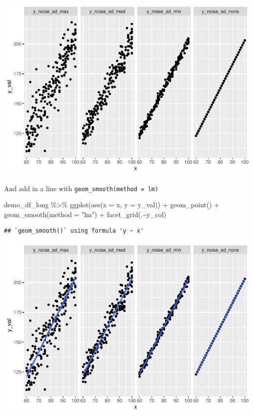 \documentclass[
]{book}
\newenvironment{Shaded}{\begin{snugshade}}{\end{snugshade}}
\newcommand{\AttributeTok}[1]{\textcolor[rgb]{0.77,0.63,0.00}{#1}}
\newcommand{\FunctionTok}[1]{\textcolor[rgb]{0.00,0.00,0.00}{#1}}
\newcommand{\NormalTok}[1]{#1}
\newcommand{\SpecialCharTok}[1]{\textcolor[rgb]{0.00,0.00,0.00}{#1}}
\newcommand{\StringTok}[1]{\textcolor[rgb]{0.31,0.60,0.02}{#1}}
\begin{document}
\includegraphics{test_course_notes_files/figure-latex/remedy035-1.pdf}

And add in a line with \texttt{geom\_smooth(method\ =\ \textquotesingle{}lm\textquotesingle{})}

\begin{Shaded}
\begin{Highlighting}[]
\NormalTok{demo\_df\_long }\SpecialCharTok{\%\textgreater{}\%} 
  \FunctionTok{ggplot}\NormalTok{(}\FunctionTok{aes}\NormalTok{(}\AttributeTok{x =}\NormalTok{ x, }\AttributeTok{y =}\NormalTok{ y\_val)) }\SpecialCharTok{+}
  \FunctionTok{geom\_point}\NormalTok{() }\SpecialCharTok{+}
  \FunctionTok{geom\_smooth}\NormalTok{(}\AttributeTok{method =} \StringTok{"lm"}\NormalTok{) }\SpecialCharTok{+} 
  \FunctionTok{facet\_grid}\NormalTok{(.}\SpecialCharTok{\textasciitilde{}}\NormalTok{y\_col)}
\end{Highlighting}
\end{Shaded}

\begin{verbatim}
## `geom_smooth()` using formula 'y ~ x'
\end{verbatim}

\includegraphics{test_course_notes_files/figure-latex/remedy036-1.pdf}
\end{document}
